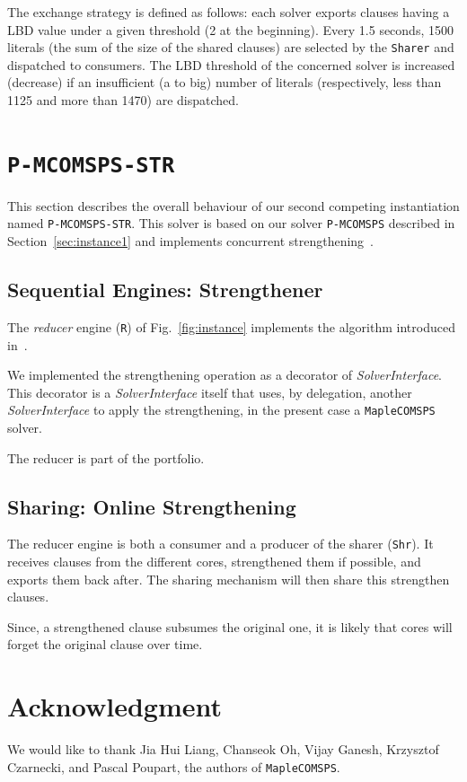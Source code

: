 \documentclass[conference]{IEEEtran}
\newcommand{\maple}[0]{\texttt{MapleCOMSPS}\xspace}
\newcommand{\pmcomsps}[0]{\texttt{P-MCOMSPS}\xspace}
\newcommand{\preduce}[0]{\texttt{P-MCOMSPS-STR}\xspace}
\begin{document}
The exchange strategy is  defined  as follows: each solver exports clauses
having a LBD value under a given threshold (2 at the beginning). Every 1.5
seconds, 1500 literals (the sum of the size of the shared clauses) are selected
by the \texttt{Sharer} and dispatched to consumers. The LBD threshold of the
concerned solver is increased (decrease) if an insufficient (a to big) number
of literals (respectively, less than 1125 and more than 1470) are dispatched.

\section{\preduce}
\label{sec:instance2}

This section describes the overall behaviour of our second competing
instantiation named \preduce. This solver is based on our solver \pmcomsps
described in Section~\ref{sec:instance1} and implements concurrent
strengthening~\cite{}.

\subsection{Sequential Engines: Strengthener}

The \textit{reducer} engine (\texttt{R}) of Fig.~\ref{fig:instance} implements
the algorithm introduced in~\cite{strength_13}.

We implemented the strengthening operation as a decorator of
\textit{SolverInterface}. This decorator is a \textit{SolverInterface} itself
that uses, by delegation, another \textit{SolverInterface} to apply the
strengthening, in the present case a \maple solver.

The reducer is part of the portfolio.

\subsection{Sharing: Online Strengthening}

The reducer engine is both a consumer and a producer of the sharer
(\texttt{Shr}). It receives clauses from the different cores, strengthened
them if possible, and exports them back after. The sharing mechanism will then
share this strengthen clauses.

Since, a strengthened clause subsumes the original one, it is likely that cores
will forget the original clause over time.

\section*{Acknowledgment}

We would like to thank Jia Hui Liang, Chanseok Oh, Vijay Ganesh, Krzysztof
Czarnecki, and Pascal Poupart, the authors of \maple.



\end{document}
